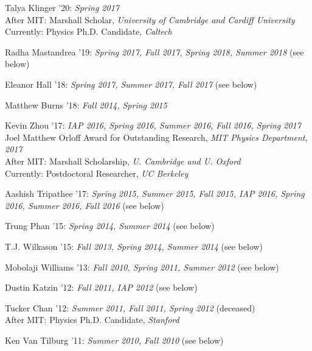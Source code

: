 \item Talya Klinger '20: \emph{Spring 2017}
\\ After MIT: Marshall Scholar, \emph{University of Cambridge and Cardiff University}
\\ Currently: Physics Ph.D. Candidate, \emph{Caltech}

\item Radha Mastandrea '19: \emph{Spring 2017, Fall 2017, Spring 2018, Summer 2018} (see below) 

\item Eleanor Hall '18: \emph{Spring 2017, Summer 2017, Fall 2017} (see below) 

\item Matthew Burns '18: \emph{Fall 2014, Spring 2015}

\item Kevin Zhou '17: \emph{IAP 2016, Spring 2016, Summer 2016, Fall 2016, Spring 2017}
\\ Joel Matthew Orloff Award for Outstanding Research, \emph{MIT Physics Department, 2017}
\\ After MIT: Marshall Scholarship, \emph{U. Cambridge and U. Oxford}
\\ Currently: Postdoctoral Researcher, \emph{UC Berkeley}

\item Aashish Tripathee '17: \emph{Spring 2015, Summer 2015, Fall 2015, IAP 2016, Spring 2016, Summer 2016, Fall 2016} (see below) 

\item Trung Phan '15: \emph{Spring 2014, Summer 2014} (see below) 

\item T.J. Wilkason '15: \emph{Fall 2013, Spring 2014, Summer 2014} (see below) 

\item Mobolaji Williams '13: \emph{Fall 2010, Spring 2011, Summer 2012} (see below) 

\item Dustin Katzin '12: \emph{Fall 2011, IAP 2012} (see below) 

\item Tucker Chan '12: \emph{Summer 2011, Fall 2011, Spring 2012} (deceased) 
\\ After MIT: Physics Ph.D. Candidate, \emph{Stanford}

\item Ken Van Tilburg '11: \emph{Summer 2010, Fall 2010} (see below) 

\el
